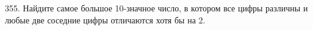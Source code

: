 355. Найдите самое большое 10-значное число, в котором все цифры различны и любые две соседние цифры отличаются хотя бы на 2.\\
